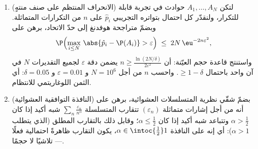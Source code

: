 \begin{problem}
\begin{enumerate}[resume]
  \item (الانحراف المنتظم على صنف منتهٍ) لتكن $A_1,
        \dots, A_N$ حوادث في
        تجربة قابلة للتكرار، ولنقدّر كل احتمال بتواتره
        التجريبي $\hat p_i$ على $n$ من التكرارات 
        المتماثلة. وبضمّ متراجحة هوفدنغ إلى حدّ الاتحاد، برهن
        على
        \[
        \P\Bigl(\max_{i\leq N}\,\abs{\hat p_i - \P(A_i)} >
        \varepsilon\Bigr) \;\leq\; 2N\,\eu^{-2n\varepsilon^2},
        \]
        واستنتج قاعدة حجم العيّنة: أن $n \geq
        \frac{\ln(2N/\delta)}{2\varepsilon^2}$ يضمن دقة
        $\varepsilon$ لجميع التقديرات $N$ في آن واحد باحتمال
        $\geq 1 -
        \delta$. واحسب $n$ من أجل $N = 10^6$ و $\varepsilon =
        0.01$ و
        $\delta = 0.05$: أي الثمن اللوغاريتمي للانتظام.
  \item (النافذة التوافقية العشوائية) بضمّ شقّي نظرية
        المتسلسلات العشوائية، برهن على أنه من أجل إشارات
         متماثلة $(\varepsilon_n)$ تتقارب المتسلسلة $\sum_n\frac{\varepsilon_n}{n^\alpha}$ شبه
        أكيد إذا كان $\alpha > \frac12$ وتتباعد شبه أكيد إذا كان $\alpha \leq \frac12$؛
        وقابل ذلك بالتقارب المطلق (الذي يتطلب $\alpha > 1$):
        أي إنه على النافذة $\alpha \in \intoc{\frac12}1$، يكون التقارب ظاهرةً
        احتمالية فعلًا --- تلاشيًا لا حجمًا.
\end{enumerate}
\end{problem}
